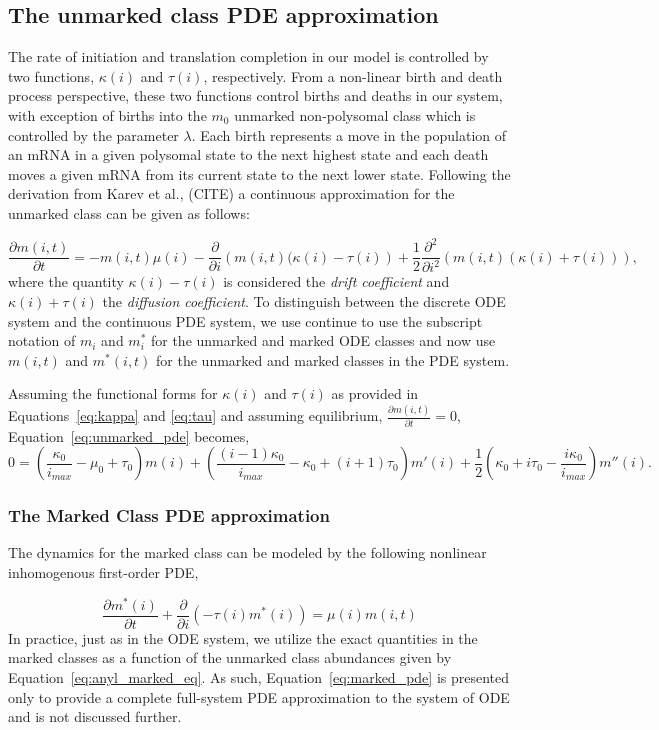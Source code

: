 \documentclass[review]{elsarticle}
\newcommand\p[2]{\frac{\partial #1}{\partial #2}}
\newcommand\ptwo[2]{\frac{\partial^2 #1}{\partial #2^2}}
\begin{document}
\subsection{The unmarked class PDE approximation}
The rate of initiation and translation completion in our model is controlled by two functions, $\kappa(i)$ and $\tau(i)$, respectively.
From a non-linear birth and death process perspective, these two functions control births and deaths in our system, with exception of births into the $m_0$ unmarked non-polysomal class which is controlled by the parameter $\lambda$.
Each birth represents a move in the population of an mRNA in a given polysomal state to the next highest state and each death moves a given mRNA from its current state to the next lower state.
Following the derivation from Karev et al., (CITE) a continuous approximation for the unmarked class can be given as follows:

\begin{equation}\label{eq:unmarked_pde}
\p{m(i,t)}{t}=-m(i,t)\mu(i)-\p{}{i}\left(m(i,t)(\kappa(i)-\tau(i)\right)+\frac{1}{2}\ptwo{}{i}\left(m(i,t)(\kappa(i)+\tau(i))\right),
\end{equation} where the quantity $\kappa(i)-\tau(i)$ is considered the \emph{drift coefficient} and $\kappa(i)+\tau(i)$ the \emph{diffusion coefficient}.
To distinguish between the discrete ODE system and the continuous PDE system, we use continue to use the subscript notation of $m_i$ and $m_i^*$ for the unmarked and marked ODE classes and now use $m(i,t)$ and $m^*(i,t)$ for the unmarked and marked classes in the PDE system.

Assuming the functional forms for $\kappa(i)$ and $\tau(i)$ as provided in Equations~\ref{eq:kappa} and \ref{eq:tau} and assuming equilibrium, $\p{m(i,t)}{t}=0$, Equation~\ref{eq:unmarked_pde} becomes,
\begin{equation}
0=\left(\frac{\kappa_0}{i_{max}}-\mu_0+\tau_0\right)m(i)+\left(\frac{(i-1)\kappa_0}{i_{max}}-\kappa_0+(i+1)\tau_0\right)m'(i)+\frac{1}{2}\left(\kappa_0+i\tau_0-\frac{i\kappa_0}{i_{max}}\right)m''(i).
\end{equation}
\subsubsection{The Marked Class PDE approximation}
The dynamics for the marked class can be modeled by the following nonlinear inhomogenous first-order PDE,

\begin{equation}\label{eq:marked_pde}
\frac{\partial m^*(i)}{\partial t}+\frac{\partial}{\partial i}\left(-\tau(i)m^*(i)\right)=\mu(i)m(i,t)
\end{equation}
In practice, just as in the ODE system, we utilize the exact quantities in the marked classes as a function of the unmarked class abundances given by Equation~\ref{eq:anyl_marked_eq}.
As such, Equation~\ref{eq:marked_pde} is presented only to provide a complete full-system PDE approximation to the system of ODE and is not discussed further.
\end{document}
